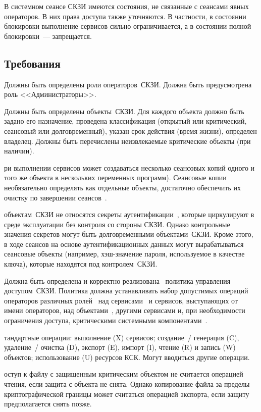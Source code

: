 В системном сеансе СКЗИ имеются состояния, не связанные с сеансами явных 
операторов. В них права доступа также уточняются. 
%
В частности, в состоянии блокировки выполнение сервисов 
сильно ограничивается, а в состоянии полной блокировки~--- запрещается. 

\subsection{Требования}\label{AC.Reqs}

\label{R.AC.Roles} %
Должны быть определены роли операторов~СКЗИ. 
Должна быть предусмотрена роль <<Администраторы>>.

\label{R.AC.Objects} %
Должны быть определены объекты~СКЗИ.
Для каждого объекта должно быть задано его назначение,
проведена классификация (открытый или критический, сеансовый или 
долговременный), указан срок действия (время жизни), определен владелец.
Должны быть перечислены неизвлекаемые критические объекты (при наличии).

\begin{notes}
ри выполнении сервисов может создаваться несколько сеансовых 
копий одного и того же объекта  в нескольких переменных 
программ). 
%
Сеансовые копии необязательно определять как отдельные объекты,
достаточно обеспечить их очистку по завершении сеансов~.

 объектам~СКЗИ не относятся секреты 
аутентификации~, которые циркулируют в среде эксплуатации 
без контроля со стороны СКЗИ. 
%
Однако контрольные значения секретов могут быть долговременными объектами~СКЗИ.
Кроме этого, в ходе сеансов на основе аутентификационных данных могут
вырабатываться сеансовые объекты (например, хэш-значение пароля, используемое в
качестве ключа), которые находятся под контролем~СКЗИ.
\end{notes}

\label{R.AC.Policy} %
Должна быть определена и корректно реализована~ 
политика управления доступом~СКЗИ.
Политика должна устанавливать набор допустимых 
операций операторов различных ролей~ 
над сервисами~ и сервисов, 
выступающих от имени операторов, над объектами~,
другими сервисами и, при необходимости ограничения доступа, 
критическими системными компонентами~.

\begin{notes}
тандартные операции: 
выполнение (X) сервисов; 
создание~/ генерация (C), удаление~/ очистка (D), экспорт (E), импорт (I), 
чтение (R) и запись (W) объектов; 
использование (U) ресурсов КСК.
%
Могут вводиться другие операции.

оступ к файлу с защищенным критическим объектом не считается 
операцией чтения, если защита с объекта не снята. Однако копирование файла за 
пределы криптографической границы может считаться операцией экспорта, если 
защиту предполагается снять позже.
\end{notes}

